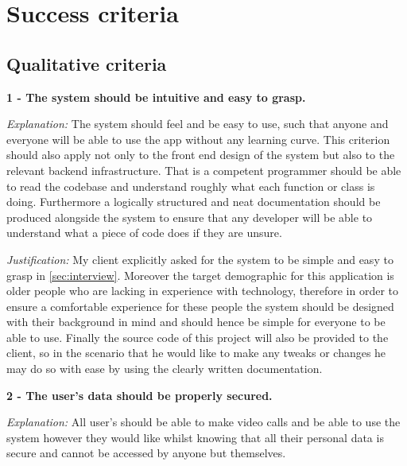 \section{Success criteria}

\subsection{Qualitative criteria}

\textbf{1 - The system should be intuitive and easy to grasp.}
\vspace{0.1cm}

\textit{Explanation:}
The system should feel and be easy to use, such that anyone
and everyone will be able to use the app without any learning
curve. This criterion should also apply not only to the front
end design of the system but also to the relevant backend 
infrastructure. That is a competent programmer should be able to 
read the codebase and understand roughly what each function or 
class is doing. Furthermore a logically structured and neat 
documentation should be produced alongside the system to 
ensure that any developer will be able to understand what 
a piece of code does if they are unsure.

\vspace{0.1cm}

\textit{Justification:} 
My client explicitly asked for the system to be simple and 
easy to grasp in \ref{sec:interview}. Moreover the target 
demographic for this application is older people who are 
lacking in experience with technology, therefore in order to 
ensure a comfortable experience for these people the system 
should be designed with their background in mind and should
hence be simple for everyone to be able to use. Finally the 
source code of this project will also be provided to the 
client, so in the scenario that he would like to make any 
tweaks or changes he may do so with ease by using the clearly 
written documentation.

\vspace{0.2cm}

\textbf{2 - The user's data should be properly secured.} 

\vspace{0.1cm}

\textit{Explanation:} 
All user's should be able to make video calls and be able to 
use the system however they would like whilst knowing that all
their personal data is secure and cannot be accessed by anyone
but themselves.

